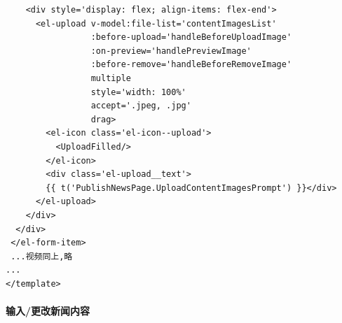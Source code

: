 \begin{itemize}
\begin{verbatim}
    <div style='display: flex; align-items: flex-end'>
      <el-upload v-model:file-list='contentImagesList'
                 :before-upload='handleBeforeUploadImage'
                 :on-preview='handlePreviewImage'
                 :before-remove='handleBeforeRemoveImage'
                 multiple
                 style='width: 100%'
                 accept='.jpeg, .jpg'
                 drag>
        <el-icon class='el-icon--upload'>
          <UploadFilled/>
        </el-icon>
        <div class='el-upload__text'>
        {{ t('PublishNewsPage.UploadContentImagesPrompt') }}</div>
      </el-upload>
    </div>
  </div>
 </el-form-item>
 ...视频同上,略
...
</template>
	\end{verbatim}
\end{itemize}

\paragraph{输入/更改新闻内容}
